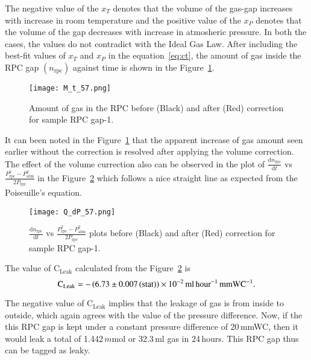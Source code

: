 The negative value of the $x_T$ denotes that the volume of the gas-gap increases with increase in room temperature and the positive value of the $x_P$ denotes that the volume of the gap decreases with increase in atmosheric pressure. In both the cases, the values do not contradict with the Ideal Gas Law. After including the best-fit values of $x_T$ and $x_P$ in the equation~\ref{eq:ct}, the amount of gas inside the RPC gap $\left(n_{\textrm{rpc}}\right)$ against time is shown in the Figure~\ref{fig:with}.
\begin{figure}[h]
  \centering
  \texttt{[image: M\_t\_57.png]}
  \caption{Amount of gas in the RPC before (Black) and after (Red) correction for sample RPC gap-1.
  }
  \label{fig:with}
\end{figure} 
It can been noted in the Figure~\ref{fig:with} that the apparent increase of gas amount seen earlier without the correction is resolved after applying the volume correction. The effect of the volume currection also can be observed in the plot of $\frac{\mathrm{d}n_{\textrm{rpc}}}{\mathrm{d}t}$ vs $\frac{P_{\textrm{rpc}}^{2}-P_{\textrm{atm}}^{2}}{2P_{\textrm{rpc}}}$ in the Figure~\ref{fig:qt} which follows a nice straight line as expected from the Poiseuille's equation.
\begin{figure}[h]
  \centering
  \texttt{[image: Q\_dP\_57.png]}
  \caption{$\frac{\mathrm{d}n_{\textrm{rpc}}}{\mathrm{d}t}$ vs $\frac{P_{\textrm{rpc}}^{2}-P_{\textrm{atm}}^{2}}{2P_{\textrm{rpc}}}$ plots before (Black) and after (Red) correction for sample RPC gap-1.}
  \label{fig:qt}
\end{figure}

The value of $\textrm{C}_{\textrm{Leak}}$ calculated from the Figure~\ref{fig:qt} is
\[\textrm{C}_{\textrm{Leak}}=-\left(6.73\pm 0.007\left(\textrm{stat}\right)\right)\times 10^{-2}\textrm{\,ml\,hour$^{-1}$\,mmWC$^{-1}$}.\]

The negative value of $\textrm{C}_{\textrm{Leak}}$ implies that the leakage of gas is from inside to outside, which again agrees with the value of the pressure difference. Now, if the this RPC gap is kept under a constant pressure difference of 20\,mmWC, then it would leak a total of 1.442\,$m$mol or 32.3\,ml gas in 24\,hours. This RPC gap thus can be tagged as leaky.

